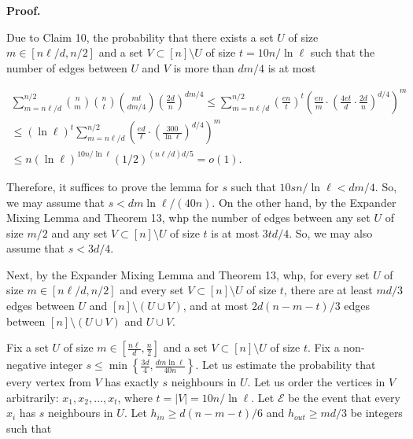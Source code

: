 \documentclass[10pt,a4paper]{article}
\begin{document}



\par\medskip\noindent\textbf{Proof.}\par




Due to Claim 10, the probability that there exists a set $U$ of size $m\in[n\ell/d,n/2]$ and a set $V\subset[n]\setminus U$ of size $t=10n/\ln\ell$ such that the number of edges between $U$ and $V$ is more than $dm/4$ is at most\par


\[\begin{gathered}
\displaystyle\sum_{m=n\ell/d}^{n/2}{n\choose m}{n\choose t}{mt\choose dm/4}\left(\frac{2d}{n}\right)^{dm/4} \displaystyle\leq\sum_{m=n\ell/d}^{n/2}\left(\frac{en}{t}\right)^{t}\left(\frac{en}{m}\cdot\left(\frac{4et}{d}\cdot\frac{2d}{n}\right)^{d/4}\right)^{m} \\
\displaystyle\leq(\ln\ell)^{t}\sum_{m=n\ell/d}^{n/2}\left(\frac{ed}{\ell}\cdot\left(\frac{300}{\ln\ell}\right)^{d/4}\right)^{m} \\
\displaystyle\leq n(\ln\ell)^{10n/\ln\ell}\left(1/2\right)^{(n\ell/d)d/5}=o(1).
\end{gathered}\]


Therefore, it suffices to prove the lemma for $s$ such that $10sn/\ln\ell<dm/4$. So, we may assume that $s<dm\ln\ell/(40n)$. On the other hand, by the Expander Mixing Lemma and Theorem 13, whp the number of edges between any set $U$ of size $m/2$ and any set $V\subset[n]\setminus U$ of size $t$ is at most $3td/4$. So, we may also assume that $s<3d/4$.\par




Next, by the Expander Mixing Lemma and Theorem 13, whp, for every set $U$ of size $m\in[n\ell/d,n/2]$ and every set $V\subset[n]\setminus U$ of size $t$, there are at least $md/3$ edges between $U$ and $[n]\setminus(U\cup V)$, and at most $2d(n-m-t)/3$ edges between $[n]\setminus(U\cup V)$ and $U\cup V$.\par




Fix a set $U$ of size $m\in[\frac{n\ell}{d},\frac{n}{2}]$ and a set $V\subset[n]\setminus U$ of size $t$. Fix a non-negative integer
$s\leq\min\left\{\frac{3d}{4},\frac{dm\ln\ell}{40n}\right\}$. Let us estimate the probability that every vertex from $V$ has exactly $s$ neighbours in $U$. Let us order the vertices in $V$ arbitrarily: $x_{1},x_{2},\ldots,x_{t}$, where $t=|V|=10n/\ln\ell$. Let $\mathcal{E}$ be the event that every $x_{i}$ has $s$ neighbours in $U$. Let $h_{in}\geq d(n-m-t)/6$ and $h_{out}\geq md/3$ be integers such that\par
\end{document}

